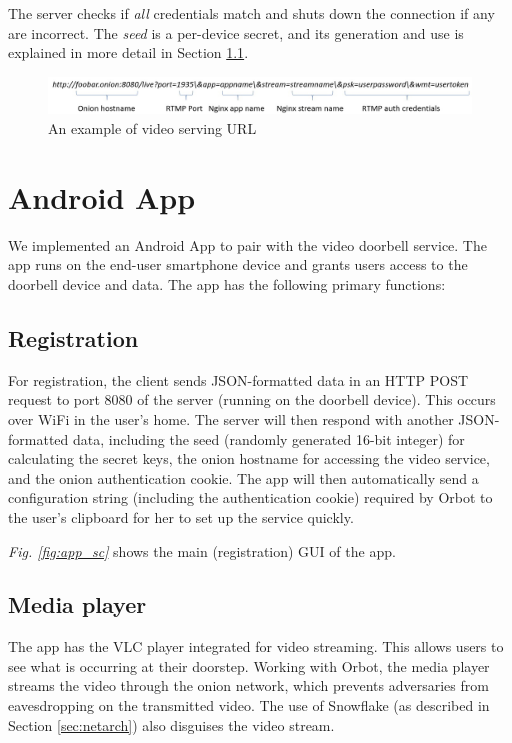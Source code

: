 The server checks if \textit{all} credentials match and shuts down the connection if any are incorrect. The \textit{seed} is a per-device secret, and its generation and use is explained in more detail in Section \ref{sec:registration}.

\begin{figure}
	\includegraphics[width=\linewidth]{fig_url.jpg}
	\caption{An example of video serving URL}
	\label{fig:url}
\end{figure}



\section{Android App}
We implemented an Android App to pair with the video doorbell service. The app runs on the end-user smartphone device and grants users access to the doorbell device and data. The app has the following primary functions:

\subsection{Registration} 
\label{sec:registration}
For registration, the client sends JSON-formatted data in an HTTP POST request to port 8080 of the server (running on the doorbell device). This occurs over WiFi in the user's home. The server will then respond with another JSON-formatted data, including the seed (randomly generated 16-bit integer) for calculating the secret keys, the onion hostname for accessing the video service, and the onion authentication cookie. The app will then automatically send a configuration string (including the authentication cookie) required by Orbot to the user’s clipboard for her to set up the service quickly. 

\textit{Fig. \ref{fig:app_sc}} shows the main (registration) GUI of the app.


\subsection{Media player} The app has the VLC player integrated for video streaming. This allows users to see what is occurring at their doorstep. Working with Orbot, the media player streams the video through the onion network, which prevents adversaries from eavesdropping on the transmitted video. The use of Snowflake (as described in Section \ref{sec:netarch}) also disguises the video stream.

